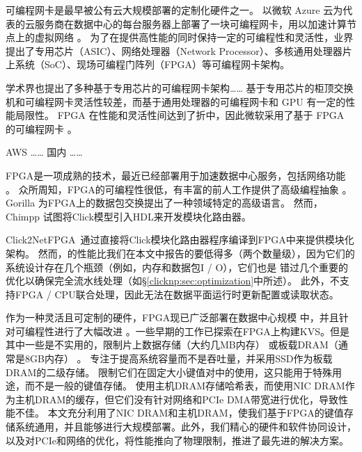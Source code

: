 可编程网卡是最早被公有云大规模部署的定制化硬件之一。
以微软 Azure 云为代表的云服务商在数据中心的每台服务器上部署了一块可编程网卡，用以加速计算节点上的虚拟网络 \cite{smartnic}。
为了在提供高性能的同时保持一定的可编程性和灵活性，业界提出了专用芯片（ASIC）、网络处理器（Network Processor）、多核通用处理器片上系统（SoC）、现场可编程门阵列（FPGA）等可编程网卡架构。

学术界也提出了多种基于专用芯片的可编程网卡架构……
基于专用芯片的柜顶交换机和可编程网卡灵活性较差，而基于通用处理器的可编程网卡和 GPU 有一定的性能局限性。
FPGA 在性能和灵活性间达到了折中，因此微软采用了基于 FPGA 的可编程网卡 \cite{putnam2014reconfigurable}。

AWS …… 国内 ……

FPGA是一项成熟的技术，最近已经部署用于加速数据中心服务，包括网络功能 \cite {putnam2014reconfigurable,smartnic,rubow2010chimpp,lavasani2012compiling}。
众所周知，FPGA的可编程性很低，有丰富的前人工作提供了高级编程抽象 \cite {bluespec,auerbach2010lime,bacon2013fpga,singh2011implementing,bachrach2012chisel,wester2015transformation}。
Gorilla \cite {lavasani2012compiling} 为FPGA上的数据包交换提出了一种领域特定的高级语言。
然而，Chimpp \cite {rubow2010chimpp} 试图将Click模型引入HDL来开发模块化路由器。

Click2NetFPGA~\cite {Click2NetFPGA}通过直接将Click模块化路由器\cite {kohler2000click}程序编译到FPGA中来提供模块化架构。
然而，\cite {Click2NetFPGA}的性能比我们在本文中报告的要低得多（两个数量级），因为它们的系统设计存在几个瓶颈（例如，内存和数据包I / O），它们也是 错过几个重要的优化以确保完全流水线处理（如\S \ref {clicknp:sec:optimization}中所述）。
此外，\cite {Click2NetFPGA}不支持FPGA / CPU联合处理，因此无法在数据平面运行时更新配置或读取状态。




作为一种灵活且可定制的硬件，FPGA现已广泛部署在数据中心规模 \cite {putnam2014reconfigurable,caulfield2016cloud}中，并且针对可编程性进行了大幅改进 \cite {bacon2013fpga,li2016clicknp}。一些早期的工作已探索在FPGA上构建KVS。但是其中一些是不实用的，限制片上数据存储（大约几MB内存） \cite {liang16fpl}或板载DRAM（通常是8GB内存） \cite {istvan2013flexible,chalamalasetti2013fpga,istvan2015hash}。
\cite {blott2015scaling}专注于提高系统容量而不是吞吐量，并采用SSD作为板载DRAM的二级存储。
\cite {liang16fpl,chalamalasetti2013fpga}限制它们在固定大小键值对中的使用，这只能用于特殊用途，而不是一般的键值存储。
\cite {blott13hotcloud,lavasani2014fpga}使用主机DRAM存储哈希表，而\cite {tokusashi2016multilevel}使用NIC DRAM作为主机DRAM的缓存，但它们没有针对网络和PCIe DMA带宽进行优化，导致性能不佳。
本文充分利用了NIC DRAM和主机DRAM，使我们基于FPGA的键值存储系统通用，并且能够进行大规模部署。此外，我们精心的硬件和软件协同设计，以及对PCIe和网络的优化，将性能推向了物理限制，推进了最先进的解决方案。


